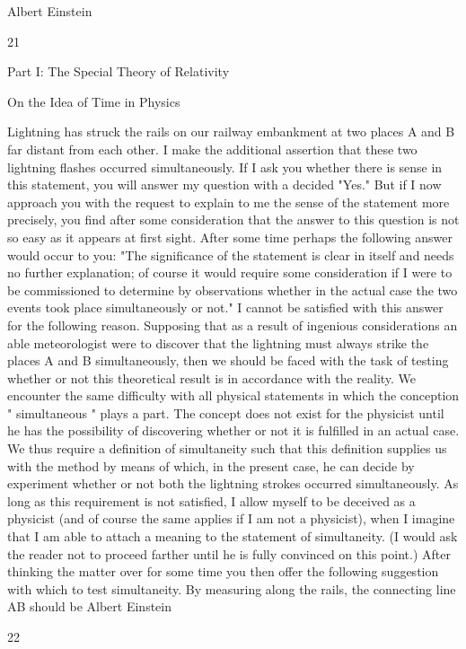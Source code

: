 \documentclass{article}
\begin{document}
Albert Einstein

21

Part I: The Special Theory of Relativity

On the Idea of Time in Physics

Lightning has struck the rails on our railway embankment at two places A and B far
distant from each other. I make the additional assertion that these two lightning flashes
occurred simultaneously. If I ask you whether there is sense in this statement, you will
answer my question with a decided "Yes." But if I now approach you with the request to
explain to me the sense of the statement more precisely, you find after some consideration
that the answer to this question is not so easy as it appears at first sight.
After some time perhaps the following answer would occur to you: "The significance of
the statement is clear in itself and needs no further explanation; of course it would require
some consideration if I were to be commissioned to determine by observations whether in
the actual case the two events took place simultaneously or not." I cannot be satisfied with
this answer for the following reason. Supposing that as a result of ingenious considerations
an able meteorologist were to discover that the lightning must always strike the places A
and B simultaneously, then we should be faced with the task of testing whether or not this
theoretical result is in accordance with the reality. We encounter the same difficulty with all
physical statements in which the conception " simultaneous " plays a part. The concept does
not exist for the physicist until he has the possibility of discovering whether or not it is
fulfilled in an actual case. We thus require a definition of simultaneity such that this
definition supplies us with the method by means of which, in the present case, he can decide
by experiment whether or not both the lightning strokes occurred simultaneously. As long
as this requirement is not satisfied, I allow myself to be deceived as a physicist (and of
course the same applies if I am not a physicist), when I imagine that I am able to attach a
meaning to the statement of simultaneity. (I would ask the reader not to proceed farther
until he is fully convinced on this point.)
After thinking the matter over for some time you then offer the following suggestion with
which to test simultaneity. By measuring along the rails, the connecting line AB should be
Albert Einstein

22
\end{document}
